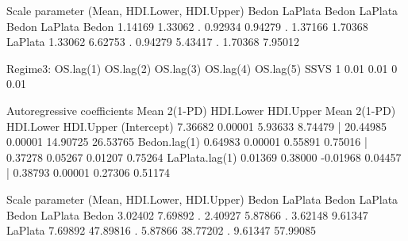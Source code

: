 \begin{example}
Scale parameter (Mean, HDI.Lower, HDI.Upper)
          Bedon LaPlata        Bedon LaPlata        Bedon LaPlata
Bedon   1.14169 1.33062    . 0.92934 0.94279    . 1.37166 1.70368
LaPlata 1.33062 6.62753    . 0.94279 5.43417    . 1.70368 7.95012


Regime3:
     OS.lag(1) OS.lag(2) OS.lag(3) OS.lag(4) OS.lag(5)
SSVS         1      0.01      0.01         0      0.01

Autoregressive coefficients
                  Mean  2(1-PD) HDI.Lower HDI.Upper    Mean   2(1-PD) HDI.Lower HDI.Upper
(Intercept)     7.36682 0.00001  5.93633  8.74479  | 20.44985 0.00001 14.90725 26.53765
Bedon.lag(1)    0.64983 0.00001  0.55891  0.75016  |  0.37278 0.05267  0.01207  0.75264
LaPlata.lag(1)  0.01369 0.38000 -0.01968  0.04457  |  0.38793 0.00001  0.27306  0.51174

Scale parameter (Mean, HDI.Lower, HDI.Upper)
          Bedon  LaPlata        Bedon  LaPlata        Bedon  LaPlata
Bedon   3.02402  7.69892    . 2.40927  5.87866    . 3.62148  9.61347
LaPlata 7.69892 47.89816    . 5.87866 38.77202    . 9.61347 57.99085
\end{example}

